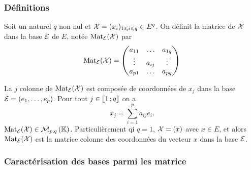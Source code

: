 \subsubsection{Définitions}

\begin{defdef}
  Soit un naturel \(q\) non nul et \(\mathcal{X}=(x_i)_{1 \leqslant i \leqslant q} 
  \in E^q\). On définit la matrice de \(\mathcal{X}\) dans la base \(\mathcal{E}\) de \(E\), 
  notée \(\mathrm{Mat}_{\mathcal{E}}(\mathcal{X})\) par
  \begin{equation}
    \mathrm{Mat}_{\mathcal{E}}(\mathcal{X}) =
    \begin{pmatrix}
      a_{11} & \ldots & a_{1q} \\
      \vdots & a_{ij} & \vdots \\
      a_{p1} & \ldots & a_{pq}
    \end{pmatrix}
  \end{equation}

  La \(j\)\ieme{} colonne de \(\mathrm{Mat}_{\mathcal{E}}(\mathcal{X})\) est composée de coordonnées 
  de \(x_j\) dans la base \(\mathcal{E}=(e_1, \ldots, e_p)\). Pour tout \(j \in 
  \mathopen{\llbracket}1\mathclose{}\mathpunct{};q\mathclose{\rrbracket}\) on a
  \begin{equation}
    x_j = \sum_{i=1}^p a_{ij}e_i.
  \end{equation}
  \(\mathrm{Mat}_{\mathcal{E}}(\mathcal{X}) \in \mathcal{M}_{p,q}\left(\mathbb{K}\right)\). Particulièrement qi \(q=1\), 
  \(\mathcal{X}=(x)\) avec \(x \in E\), et alors \(\mathrm{Mat}_{\mathcal{E}}(\mathcal{X})\) est la matrice 
  colonne des coordonnées du vecteur \(x\) dans la base \(\mathcal{E}\).
\end{defdef}

\subsubsection{Caractérisation des bases parmi les matrice}

